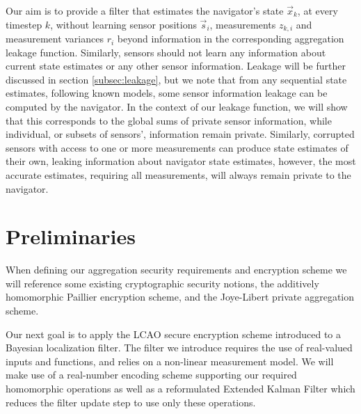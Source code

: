 \documentclass[10pt,letterpaper,oneside,twocolumn,journal]{IEEEtran}
\theoremstyle{definition}
\theoremstyle{definition}
\theoremstyle{remark}
\begin{document}
Our aim is to provide a filter that estimates the navigator's state $\vec{x}_k$, at every timestep $k$, without learning sensor positions $\vec{s}_i$, measurements $z_{k,i}$ and measurement variances $r_i$ beyond information in the corresponding aggregation leakage function. Similarly, sensors should not learn any information about current state estimates or any other sensor information. Leakage will be further discussed in section \ref{subsec:leakage}, but we note that from any sequential state estimates, following known models, some sensor information leakage can be computed by the navigator. In the context of our leakage function, we will show that this corresponds to the global sums of private sensor information, while individual, or subsets of sensors', information remain private. Similarly, corrupted sensors with access to one or more measurements can produce state estimates of their own, leaking information about navigator state estimates, however, the most accurate estimates, requiring all measurements, will always remain private to the navigator.

% 
%                                                                            
%                                                                            
%                                                                            
% 

\section{Preliminaries} \label{sec:preliminaries}
When defining our aggregation security requirements and encryption scheme we will reference some existing cryptographic security notions, the additively homomorphic Paillier encryption scheme, and the Joye-Libert private aggregation scheme.



Our next goal is to apply the LCAO secure encryption scheme introduced to a Bayesian localization filter. The filter we introduce requires the use of real-valued inputs and functions, and relies on a non-linear measurement model. We will make use of a real-number encoding scheme supporting our required homomorphic operations as well as a reformulated Extended Kalman Filter which reduces the filter update step to use only these operations.
\end{document}
